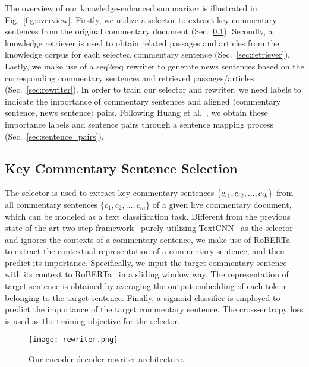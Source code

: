 The overview of our knowledge-enhanced summarizer is illustrated in Fig.~\ref{fig:overview}. Firstly, we utilize a selector to extract key commentary sentences from the original commentary document (Sec.~\ref{sec:selector}). Secondly, a knowledge retriever is used to obtain related passages and articles from the knowledge corpus for each selected commentary sentence (Sec.~\ref{sec:retriever}). Lastly, we make use of a seq2seq rewriter to generate news sentences based on the corresponding commentary sentences and retrieved passages/articles (Sec.~\ref{sec:rewriter}). In order to train our selector and rewriter, we need labels to indicate the importance of commentary sentences and aligned $\langle$commentary sentence, news sentence$\rangle$ pairs.
Following Huang et al.~\cite{Huang2020GeneratingSN}, we obtain these importance labels and sentence pairs through a sentence mapping process (Sec.~\ref{sec:sentence_pairs}).

\subsection{Key Commentary Sentence Selection}
\label{sec:selector}
The selector is used to extract key commentary sentences $\{c_{i1},c_{i2},...\\,c_{ik}\}$ from all commentary sentences $\{c_{1},c_{2},...,c_{m}\}$ of a given live commentary document, which can be modeled as a text classification task.
Different from the previous state-of-the-art two-step framework~\cite{Huang2020GeneratingSN} purely utilizing TextCNN~\cite{Kim2014ConvolutionalNN} as the selector and ignores the contexts of a commentary sentence, we make use of RoBERTa~\cite{Liu2019RoBERTaAR} to extract the contextual representation of a commentary sentence, and then predict its importance.
Specifically, we input the target commentary sentence with its context to RoBERTa~\cite{Liu2019RoBERTaAR} in a sliding window way. The representation of target sentence is obtained by averaging the output embedding of each token belonging to the target sentence.
Finally, a sigmoid classifier is employed to predict the importance of the target commentary sentence.
The cross-entropy loss is used as the training objective for the selector.

\begin{figure*}[t]
\centerline{\texttt{[image: rewriter.png]}}
\caption{Our encoder-decoder rewriter architecture.}
\label{fig:rewriter}
\end{figure*}


